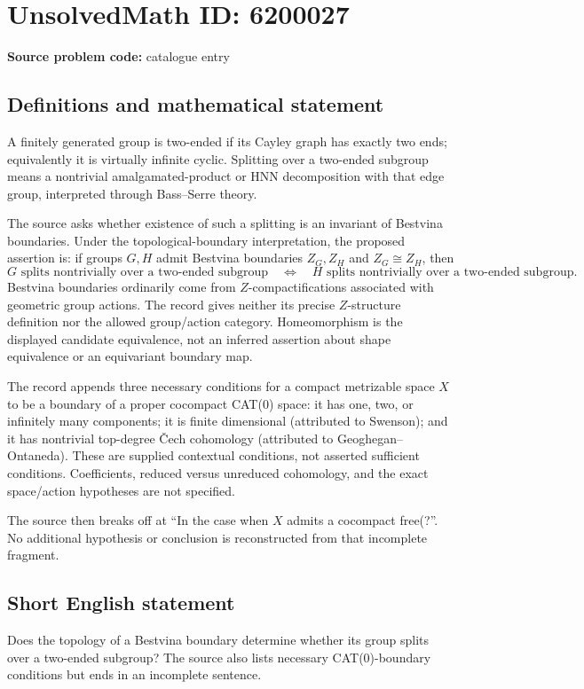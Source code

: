 \documentclass[11pt]{article}
\begin{document}
\section*{UnsolvedMath ID: 6200027}
\textbf{Source problem code:} catalogue entry
\subsection{Definitions and mathematical statement}
A finitely generated group is two-ended if its Cayley graph has exactly two ends; equivalently it is virtually infinite cyclic. Splitting over a two-ended subgroup means a nontrivial amalgamated-product or HNN decomposition with that edge group, interpreted through Bass--Serre theory.

The source asks whether existence of such a splitting is an invariant of Bestvina boundaries. Under the topological-boundary interpretation, the proposed assertion is: if groups $G,H$ admit Bestvina boundaries $Z_G,Z_H$ and $Z_G\cong Z_H$, then
\[
G\text{ splits nontrivially over a two-ended subgroup}
\quad\Longleftrightarrow\quad
H\text{ splits nontrivially over a two-ended subgroup}.
\]
Bestvina boundaries ordinarily come from $Z$-compactifications associated with geometric group actions. The record gives neither its precise $Z$-structure definition nor the allowed group/action category. Homeomorphism is the displayed candidate equivalence, not an inferred assertion about shape equivalence or an equivariant boundary map.

The record appends three necessary conditions for a compact metrizable space $X$ to be a boundary of a proper cocompact CAT(0) space: it has one, two, or infinitely many components; it is finite dimensional (attributed to Swenson); and it has nontrivial top-degree \v{C}ech cohomology (attributed to Geoghegan--Ontaneda). These are supplied contextual conditions, not asserted sufficient conditions. Coefficients, reduced versus unreduced cohomology, and the exact space/action hypotheses are not specified.

The source then breaks off at ``In the case when $X$ admits a cocompact free(?''. No additional hypothesis or conclusion is reconstructed from that incomplete fragment.
\subsection{Short English statement}
Does the topology of a Bestvina boundary determine whether its group splits over a two-ended subgroup? The source also lists necessary CAT(0)-boundary conditions but ends in an incomplete sentence.
\end{document}
